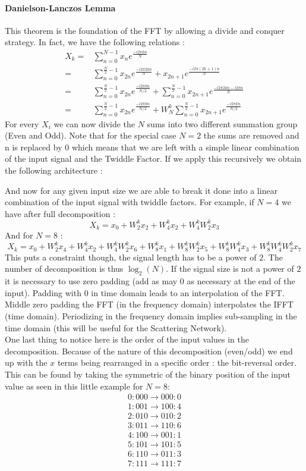 \documentclass[a4paper]{report}
\begin{document}
\paragraph{Danielson-Lanczos Lemma}
This theorem is the foundation of the FFT by allowing a divide and conquer strategy. In fact, we have the following relations :
\begin{align*}
X_k=&\sum_{n=0}^{N-1} x_n e^{\frac{-i2 \pi k n}{N}}\\
=&\sum_{n=0}^{\frac{N}{2}-1} x_{2n} e^{\frac{-i2 \pi 2k n}{N}}+ x_{2n+1} e^{\frac{-i2 \pi (2k+1) n}{N}}\\
=&\sum_{n=0}^{\frac{N}{2}-1} x_{2n} e^{\frac{-i2 \pi k n}{N/2}}+\sum_{n=0}^{\frac{N}{2}-1}x_{2n+1} e^{\frac{-i2 \pi 2k n-i2 \pi n}{N}}\\
=&\sum_{n=0}^{\frac{N}{2}-1}x_{2n} e^{\frac{-i2\pi k n}{N/2}}+W_N^k\sum_{n=0}^{\frac{N}{2}-1}x_{2n+1} e^{\frac{-i 2 \pi k n}{N/2}}
\end{align*}
For every $X_i$ we can now divide the $N$ sums into two different summation group (Even and Odd). Note that for the special case $N=2$ the sums are removed and n is replaced by $0$ which means that we are left with a simple linear combination of the input signal and the Twiddle Factor. 
If we apply this recursively we obtain the following architecture :


And now for any given input size we are able to break it done into a linear combination of the input signal with twiddle factors.
For example, if $N=4$ we have after full decomposition :
\[
X_k=x_0+W_2^kx_2+W_4^kx_2+W_4^kW_2^kx_3
\]
And for $N=8$ :
\[
X_k=x_0+W_2^kx_4+W^k_4x_2+W_4^kW_2^kx_6+W_8^kx_1+
W_8^kW_2^kx_5+W_8^kW_4^kx_3+W_8^kW_4^kW^k_2x_7
\]
This puts a constraint though, the signal length has to be a power of $2$. The number of decomposition is thus $\log_2 (N)$.
If the signal size is not a power of $2$ it is necessary to use zero padding (add as may $0$ as necessary at the end of the input). Padding with $0$ in time domain leads to an interpolation of the FFT. Middle zero padding the FFT (in the frequency domain) interpolates the IFFT (time domain). Periodizing in the frequency domain implies sub-sampling in the time domain (this will be useful for the Scattering Network).
\\
One last thing to notice here is the order of the input values in the decomposition. Because of the nature of this decomposition (even/odd) we end up with the $x$ terms being rearranged in a specific order : the bit-reversal order. This can be found by taking the symmetric of the binary position of the input value as seen in this little example for $N=8$:
\begin{align*}
0:000\rightarrow000:0\\
1:001\rightarrow100:4\\
2:010\rightarrow010:2\\
3:011\rightarrow110:6\\
4:100\rightarrow001:1\\
5:101\rightarrow101:5\\
6:110\rightarrow011:3\\
7:111\rightarrow111:7\\
\end{align*}
\end{document}
